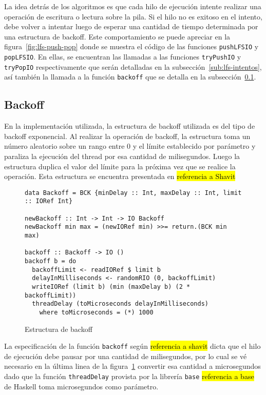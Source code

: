 La idea detrás de los algoritmos es que cada hilo de ejecución intente realizar una operación de escritura o lectura sobre la pila. Si el hilo no es exitoso en el intento, debe volver a intentar luego de esperar una cantidad de tiempo determinada por una estructura de backoff. Este comportamiento se puede apreciar en la figura~\ref{fig:lfs-push-pop} donde se muestra el código de las funciones \texttt{pushLFSIO} y \texttt{popLFSIO}. En ellas, se encuentran las llamadas a las funciones \texttt{tryPushIO} y \texttt{tryPopIO} respectivamente que serán detalladas en la subsección~\ref{sub:lfs-intentos}, así también la llamada a la función \texttt{backoff} que se detalla en la subsección~\ref{sub:backoff}.

\subsection{Backoff}\label{sub:backoff}
En la implementación utilizada, la estructura de backoff utilizada es del tipo de backoff exponencial. Al realizar la operación de backoff, la estructura toma un número aleatorio sobre un rango entre 0 y el límite establecido por parámetro y paraliza la ejecución del thread por esa cantidad de milisegundos. Luego la estructura duplica el valor del límite para la próxima vez que se realice la operación. Esta estructura se encuentra presentada en \hl{referencia a Shavit}

\begin{figure}[H]
  \begin{verbatim}
data Backoff = BCK {minDelay :: Int, maxDelay :: Int, limit :: IORef Int}

newBackoff :: Int -> Int -> IO Backoff
newBackoff min max = (newIORef min) >>= return.(BCK min max)

backoff :: Backoff -> IO ()
backoff b = do
  backoffLimit <- readIORef $ limit b
  delayInMilliseconds <- randomRIO (0, backoffLimit)
  writeIORef (limit b) (min (maxDelay b) (2 * backoffLimit))
  threadDelay (toMicroseconds delayInMilliseconds)
    where toMicroseconds = (*) 1000
  \end{verbatim}
  \caption{Estructura de backoff}
  \label{fig:backoff-code}
\end{figure}

La especificación de la función \texttt{backoff} según \hl{referencia a shavit} dicta que el hilo de ejecución debe pausar por una cantidad de milisegundos, por lo cual se vé necesario en la última linea de la figura~\ref{fig:backoff-code} convertir esa cantidad a microsegundos dado que la función \texttt{threadDelay} provista por la librería \texttt{base} \hl{referencia a base} de Haskell toma microsegundos como parámetro.

